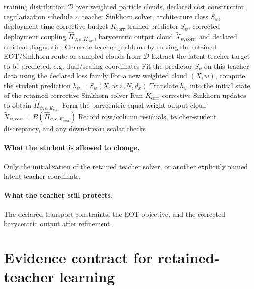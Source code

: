 \begin{algorithm}[ht]
\caption{\texttt{train\_and\_deploy\_warmstarted\_sinkhorn}}
\begin{algorithmic}[1]
\Require training distribution \(\mathcal D\) over weighted particle clouds, declared cost construction, regularization schedule \(\varepsilon\), teacher Sinkhorn solver, architecture class \(S_\psi\), deployment-time corrective budget \(K_{\mathrm{corr}}\)
\Ensure trained predictor \(S_\psi\), corrected deployment coupling \(\widehat\Pi_{\psi,\varepsilon,K_{\mathrm{corr}}}\), barycentric output cloud \(\widetilde X_{\psi,\mathrm{corr}}\), and declared residual diagnostics
\State Generate teacher problems by solving the retained EOT/Sinkhorn route on sampled clouds from \(\mathcal D\)
\State Extract the latent teacher target to be predicted, e.g. dual/scaling coordinates
\State Fit the predictor \(S_\psi\) on this teacher data using the declared loss family
\State For a new weighted cloud \((X,w)\), compute the student prediction \(h_\psi=S_\psi(X,w;\varepsilon,N,d_x)\)
\State Translate \(h_\psi\) into the initial state of the retained corrective Sinkhorn solver
\State Run \(K_{\mathrm{corr}}\) corrective Sinkhorn updates to obtain \(\widehat\Pi_{\psi,\varepsilon,K_{\mathrm{corr}}}\)
\State Form the barycentric equal-weight output cloud \(\widetilde X_{\psi,\mathrm{corr}}=B(\widehat\Pi_{\psi,\varepsilon,K_{\mathrm{corr}}})\)
\State Record row/column residuals, teacher-student discrepancy, and any downstream scalar checks
\end{algorithmic}
\end{algorithm}

\paragraph{What the student is allowed to change.}
Only the initialization of the retained teacher solver, or another explicitly
named latent teacher coordinate.

\paragraph{What the teacher still protects.}
The declared transport constraints, the EOT objective, and the corrected
barycentric output after refinement.

\section{Evidence contract for retained-teacher learning}
\label{sec:bf-learned-ot-training-objective}
\label{sec:bf-learned-ot-residuals}

